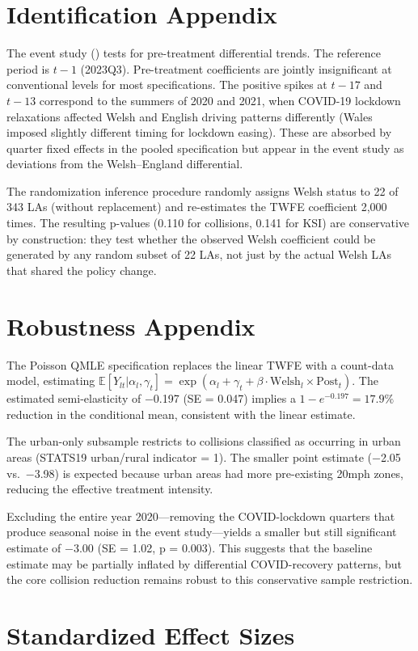\documentclass[12pt]{article}
\newcommand{\E}{\mathbb{E}}
\begin{document}
\section{Identification Appendix}

The event study () tests for pre-treatment differential trends. The reference period is $t-1$ (2023Q3). Pre-treatment coefficients are jointly insignificant at conventional levels for most specifications. The positive spikes at $t-17$ and $t-13$ correspond to the summers of 2020 and 2021, when COVID-19 lockdown relaxations affected Welsh and English driving patterns differently (Wales imposed slightly different timing for lockdown easing). These are absorbed by quarter fixed effects in the pooled specification but appear in the event study as deviations from the Welsh--England differential.

The randomization inference procedure randomly assigns Welsh status to 22 of 343 LAs (without replacement) and re-estimates the TWFE coefficient 2,000 times. The resulting p-values (0.110 for collisions, 0.141 for KSI) are conservative by construction: they test whether the observed Welsh coefficient could be generated by any random subset of 22 LAs, not just by the actual Welsh LAs that shared the policy change.

\section{Robustness Appendix}

The Poisson QMLE specification replaces the linear TWFE with a count-data model, estimating $\E[Y_{lt} | \alpha_l, \gamma_t] = \exp(\alpha_l + \gamma_t + \beta \cdot \text{Welsh}_l \times \text{Post}_t)$. The estimated semi-elasticity of $-$0.197 (SE = 0.047) implies a $1 - e^{-0.197} = 17.9\%$ reduction in the conditional mean, consistent with the linear estimate.

The urban-only subsample restricts to collisions classified as occurring in urban areas (STATS19 urban/rural indicator = 1). The smaller point estimate ($-$2.05 vs.\ $-$3.98) is expected because urban areas had more pre-existing 20mph zones, reducing the effective treatment intensity.

Excluding the entire year 2020---removing the COVID-lockdown quarters that produce seasonal noise in the event study---yields a smaller but still significant estimate of $-$3.00 (SE = 1.02, p = 0.003). This suggests that the baseline estimate may be partially inflated by differential COVID-recovery patterns, but the core collision reduction remains robust to this conservative sample restriction.

\section{Standardized Effect Sizes}
\label{sec:sde}


\end{document}
